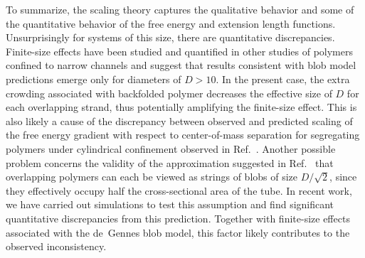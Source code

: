 \documentclass[journal=mamobx,manuscript=article,layout=twocolumn]{achemso}
\begin{document}
To summarize, the scaling theory captures the qualitative behavior and some
of the quantitative behavior of the free energy and extension length functions.
Unsurprisingly for systems of this size, there are quantitative discrepancies.
Finite-size effects have been studied and quantified in other studies of
polymers confined to narrow channels and suggest that results consistent with
blob model predictions emerge only for diameters of $D>10$.\cite{kim2013elasticity}
In the present case, the extra crowding associated with backfolded polymer
decreases the effective size of $D$ for each overlapping strand, thus potentially
amplifying the finite-size effect. This is also likely a cause of the discrepancy
between observed and predicted scaling of the free energy gradient with respect
to center-of-mass separation for segregating polymers under cylindrical confinement
observed in Ref.~. Another possible problem concerns
the validity of the approximation suggested in Ref.~ that
overlapping polymers can each be viewed as strings of blobs of size $D/\sqrt{2}$,
since they effectively occupy half the cross-sectional area of the tube. In recent
work, we have carried out simulations to test this assumption and find significant
quantitative discrepancies from this prediction.\cite{polson2017segregation} Together 
with finite-size effects associated with the de~Gennes blob model, this factor likely 
contributes to the observed inconsistency.
\end{document}
